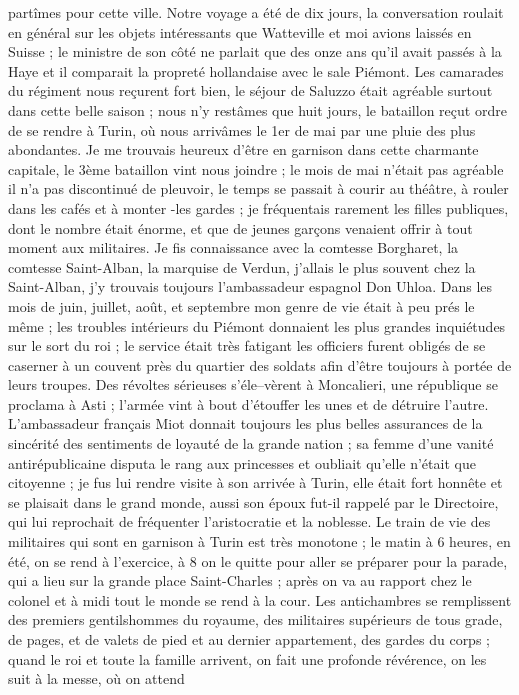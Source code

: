 \documentclass[12pt]{article}
\begin{document}
 partîmes pour cette ville. Notre voyage a été de dix
jours, la conversation roulait en général sur les objets intéressants que Watteville et moi avions
laissés en Suisse ; le ministre de son côté ne parlait que des onze ans qu’il avait passés à la Haye
et il comparait la propreté hollandaise avec le sale Piémont. Les camarades du régiment nous
reçurent fort bien, le séjour de Saluzzo était agréable surtout dans cette belle saison ; nous n’y
restâmes que huit jours, le bataillon reçut ordre de se rendre à Turin, où nous arrivâmes le 1er de
mai par une pluie des plus abondantes. Je me trouvais heureux d’être en garnison dans cette
charmante capitale, le 3ème bataillon vint nous joindre ; le mois de mai n’était pas agréable il n’a
pas discontinué de pleuvoir, le temps se passait à courir au théâtre, à rouler dans les cafés et à
monter -les gardes ; je fréquentais rarement les filles publiques, dont le nombre était énorme, et
que de jeunes garçons venaient offrir à tout moment aux militaires. Je fis connaissance avec la
comtesse Borgharet, la comtesse Saint-Alban, la marquise de Verdun, j’allais le plus souvent chez la
Saint-Alban, j’y trouvais toujours l’ambassadeur espagnol Don Uhloa. Dans les mois de juin, juillet,
août, et septembre mon genre de vie était à peu prés le même ; les troubles intérieurs du Piémont
donnaient les plus grandes inquiétudes sur le sort du roi ; le service était très fatigant les
officiers furent obligés de se caserner à un couvent près du quartier des soldats afin d’être
toujours à portée de leurs troupes. Des révoltes sérieuses s’éle–vèrent à Moncalieri, une république
se proclama à Asti ; l’armée vint à bout d’étouffer les unes et de détruire l’autre. L’ambassadeur
français Miot donnait toujours les plus belles assurances de la sincérité des sentiments de loyauté
de la grande nation ; sa femme d’une vanité antirépublicaine disputa le rang aux princesses et
oubliait qu’elle n’était que citoyenne ; je fus lui rendre visite à son arrivée à Turin, elle était
fort honnête et se plaisait dans le grand monde, aussi son époux fut-il rappelé par le Directoire,
qui lui reprochait de fréquenter l’aristocratie et la noblesse. Le train de vie des militaires qui
sont en garnison à Turin est très monotone ; le matin à 6 heures, en été, on se rend à l’exercice, à
8 on le quitte pour aller se préparer pour la parade, qui a lieu sur la grande place Saint-Charles ;
après on va au rapport chez le colonel et à midi tout le monde se rend à la cour. Les antichambres
se remplissent des premiers gentilshommes du royaume, des militaires supérieurs de tous grade, de
pages, et de valets de pied et au dernier appartement, des gardes du corps ; quand le roi et toute
la famille arrivent, on fait une profonde révérence, on les suit à la messe, où on attend
\end{document}
